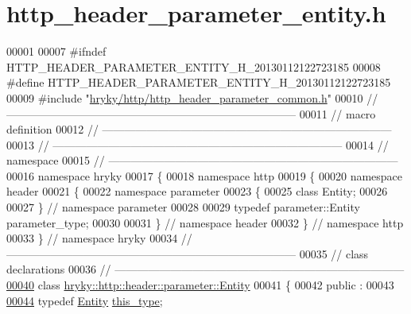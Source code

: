 \hypertarget{http__header__parameter__entity_8h_source}{\section{http\-\_\-header\-\_\-parameter\-\_\-entity.\-h}
}

\begin{DoxyCode}
00001 
00007 \textcolor{preprocessor}{#ifndef HTTP\_HEADER\_PARAMETER\_ENTITY\_H\_20130112122723185}
00008 \textcolor{preprocessor}{}\textcolor{preprocessor}{#define HTTP\_HEADER\_PARAMETER\_ENTITY\_H\_20130112122723185}
00009 \textcolor{preprocessor}{}\textcolor{preprocessor}{#include "\hyperlink{http__header__parameter__common_8h}{hryky/http/http_header_parameter_common.h}"}
00010 \textcolor{comment}{//
      ------------------------------------------------------------------------------}
00011 \textcolor{comment}{// macro definition}
00012 \textcolor{comment}{//
      ------------------------------------------------------------------------------}
00013 \textcolor{comment}{//
      ------------------------------------------------------------------------------}
00014 \textcolor{comment}{// namespace}
00015 \textcolor{comment}{//
      ------------------------------------------------------------------------------}
00016 \textcolor{keyword}{namespace }hryky
00017 \{
00018 \textcolor{keyword}{namespace }http
00019 \{
00020 \textcolor{keyword}{namespace }header
00021 \{
00022 \textcolor{keyword}{namespace }parameter
00023 \{
00025     \textcolor{keyword}{class }Entity;
00026 
00027 \} \textcolor{comment}{// namespace parameter}
00028 
00029 \textcolor{keyword}{typedef} parameter::Entity parameter\_type;
00030 
00031 \} \textcolor{comment}{// namespace header}
00032 \} \textcolor{comment}{// namespace http}
00033 \} \textcolor{comment}{// namespace hryky}
00034 \textcolor{comment}{//
      ------------------------------------------------------------------------------}
00035 \textcolor{comment}{// class declarations}
00036 \textcolor{comment}{//
      ------------------------------------------------------------------------------}
\hypertarget{http__header__parameter__entity_8h_source_l00040}{}\hyperlink{classhryky_1_1http_1_1header_1_1parameter_1_1_entity}{00040} \textcolor{comment}{}\textcolor{keyword}{class }\hyperlink{classhryky_1_1http_1_1header_1_1parameter_1_1_entity}{hryky::http::header::parameter::Entity}
00041 \{
00042 \textcolor{keyword}{public} :
00043 
\hypertarget{http__header__parameter__entity_8h_source_l00044}{}\hyperlink{classhryky_1_1http_1_1header_1_1parameter_1_1_entity_a038d813a72a33f6d764913045d15120e}{00044}     \textcolor{keyword}{typedef} \hyperlink{classhryky_1_1http_1_1header_1_1parameter_1_1_entity}{Entity} \hyperlink{classhryky_1_1http_1_1header_1_1parameter_1_1_entity_a038d813a72a33f6d764913045d15120e}{this_type};

\end{DoxyCode}
